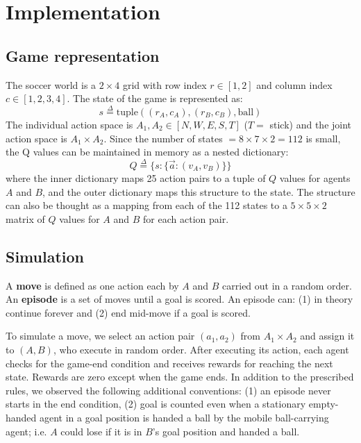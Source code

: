 \documentclass[conference]{IEEEtran}
\begin{document}
\section{Implementation}
\subsection{Game representation}
The soccer world is a $2\times 4$ grid with row index $r\in [1,2]$ and column index $c\in [1,2,3,4]$. The state of the game is represented as:
\begin{equation}
s \stackrel{\Delta}{=} \text{tuple}((r_A,c_A), (r_B,c_B), \text{ball})
\end{equation}
The individual action space is $A_1, A_2 \in [N, W, E, S, T]$ ($T=$ stick) and the joint action space is $A_1\times A_2$. Since the number of states $ = 8\times 7\times 2 = 112$ is small, the Q values can be maintained in memory as a nested dictionary:
\begin{equation}
Q \stackrel{\Delta}{=} \{s: \{\vec{a}: (v_A, v_B)\}\} 
\end{equation}
where the inner dictionary maps 25 action pairs to a tuple of $Q$ values for agents $A$ and $B$, and the outer dictionary maps this structure to the state. The structure can also be thought as a mapping from each of the 112 states to a $5\times 5\times 2$ matrix of $Q$ values for $A$ and $B$ for each action pair. 
\subsection{Simulation}
A {\bf move} is defined as one action each by $A$ and $B$ carried out in a random order. An {\bf episode} is a set of moves until a goal is scored. An episode can: (1) in theory continue forever and (2) end mid-move if a goal is scored.

To simulate a move, we select an action pair $(a_1, a_2)$ from $A_1\times A_2$ and assign it to $(A, B)$, who execute in random order. After executing its action, each agent checks for the game-end condition and receives rewards for reaching the next state. Rewards are zero except when the game ends. In addition to the prescribed rules, we observed the following additional conventions: (1) an episode never starts in the end condition, (2) goal is counted even when a stationary empty-handed agent in a goal position is handed a ball by the mobile ball-carrying agent; i.e. $A$ could lose if it is in $B$'s goal position and handed a ball.
\end{document}
